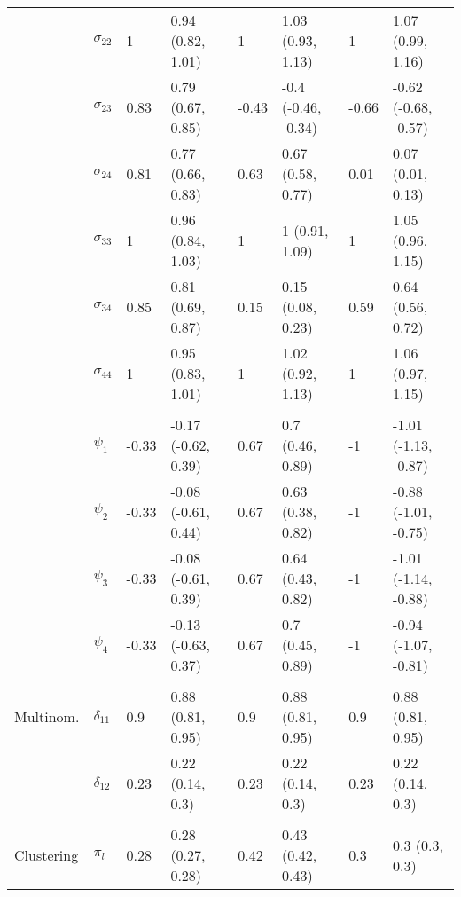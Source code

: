\documentclass[]{article}
\begin{document}
\begin{table}[t]
\begin{tabular}{llllllll}
\hspace{1em} & $\sigma_{22}$ & 1 & 0.94 (0.82, 1.01) & 1 & 1.03 (0.93, 1.13) & 1 & 1.07 (0.99, 1.16)\\
\hspace{1em} & $\sigma_{23}$ & 0.83 & 0.79 (0.67, 0.85) & -0.43 & -0.4 (-0.46, -0.34) & -0.66 & -0.62 (-0.68, -0.57)\\
\hspace{1em} & $\sigma_{24}$ & 0.81 & 0.77 (0.66, 0.83) & 0.63 & 0.67 (0.58, 0.77) & 0.01 & 0.07 (0.01, 0.13)\\
\hspace{1em} & $\sigma_{33}$ & 1 & 0.96 (0.84, 1.03) & 1 & 1 (0.91, 1.09) & 1 & 1.05 (0.96, 1.15)\\
\hspace{1em} & $\sigma_{34}$ & 0.85 & 0.81 (0.69, 0.87) & 0.15 & 0.15 (0.08, 0.23) & 0.59 & 0.64 (0.56, 0.72)\\
\hspace{1em} & $\sigma_{44}$ & 1 & 0.95 (0.83, 1.01) & 1 & 1.02 (0.92, 1.13) & 1 & 1.06 (0.97, 1.15)\\
\addlinespace[0.3em]
\multicolumn{8}{l}{\textbf{ }}\\
\hspace{1em} & $\psi_{1}$ & -0.33 & -0.17 (-0.62, 0.39) & 0.67 & 0.7 (0.46, 0.89) & -1 & -1.01 (-1.13, -0.87)\\
\hspace{1em} & $\psi_{2}$ & -0.33 & -0.08 (-0.61, 0.44) & 0.67 & 0.63 (0.38, 0.82) & -1 & -0.88 (-1.01, -0.75)\\
\hspace{1em} & $\psi_{3}$ & -0.33 & -0.08 (-0.61, 0.39) & 0.67 & 0.64 (0.43, 0.82) & -1 & -1.01 (-1.14, -0.88)\\
\hspace{1em} & $\psi_{4}$ & -0.33 & -0.13 (-0.63, 0.37) & 0.67 & 0.7 (0.45, 0.89) & -1 & -0.94 (-1.07, -0.81)\\
\addlinespace[0.3em]
\multicolumn{8}{l}{\textbf{ }}\\
\hspace{1em}Multinom. & $\delta_{11}$ & 0.9 & 0.88 (0.81, 0.95) & 0.9 & 0.88 (0.81, 0.95) & 0.9 & 0.88 (0.81, 0.95)\\
\hspace{1em} & $\delta_{12}$ & 0.23 & 0.22 (0.14, 0.3) & 0.23 & 0.22 (0.14, 0.3) & 0.23 & 0.22 (0.14, 0.3)\\
\addlinespace[0.3em]
\multicolumn{8}{l}{\textbf{ }}\\
\hspace{1em}Clustering & $\pi_l$ & 0.28 & 0.28 (0.27, 0.28) & 0.42 & 0.43 (0.42, 0.43) & 0.3 & 0.3 (0.3, 0.3)\\
\bottomrule
\end{tabular}
\end{table}
\end{document}
